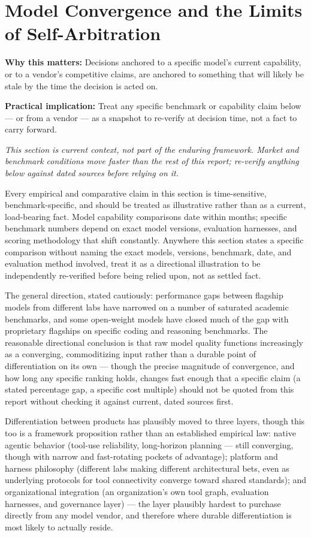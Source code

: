 \section{Model Convergence and the Limits of Self-Arbitration}

\textbf{Why this matters:} Decisions anchored to a specific model's current capability, or to a vendor's competitive claims, are anchored to something that will likely be stale by the time the decision is acted on.

\textbf{Practical implication:} Treat any specific benchmark or capability claim below --- or from a vendor --- as a snapshot to re-verify at decision time, not a fact to carry forward.

\emph{This section is current context, not part of the enduring framework. Market and benchmark conditions move faster than the rest of this report; re-verify anything below against dated sources before relying on it.}

Every empirical and comparative claim in this section is time-sensitive, benchmark-specific, and should be treated as illustrative rather than as a current, load-bearing fact. Model capability comparisons date within months; specific benchmark numbers depend on exact model versions, evaluation harnesses, and scoring methodology that shift constantly. Anywhere this section states a specific comparison without naming the exact models, versions, benchmark, date, and evaluation method involved, treat it as a directional illustration to be independently re-verified before being relied upon, not as settled fact.

The general direction, stated cautiously: performance gaps between flagship models from different labs have narrowed on a number of saturated academic benchmarks, and some open-weight models have closed much of the gap with proprietary flagships on specific coding and reasoning benchmarks. The reasonable directional conclusion is that raw model quality functions increasingly as a converging, commoditizing input rather than a durable point of differentiation on its own --- though the precise magnitude of convergence, and how long any specific ranking holds, changes fast enough that a specific claim (a stated percentage gap, a specific cost multiple) should not be quoted from this report without checking it against current, dated sources first.

Differentiation between products has plausibly moved to three layers, though this too is a framework proposition rather than an established empirical law: native agentic behavior (tool-use reliability, long-horizon planning --- still converging, though with narrow and fast-rotating pockets of advantage); platform and harness philosophy (different labs making different architectural bets, even as underlying protocols for tool connectivity converge toward shared standards); and organizational integration (an organization's own tool graph, evaluation harnesses, and governance layer) --- the layer plausibly hardest to purchase directly from any model vendor, and therefore where durable differentiation is most likely to actually reside.

